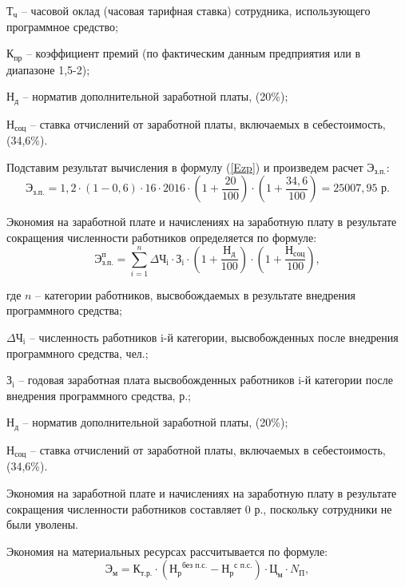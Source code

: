     $\text{Т}_{\text{ч}}$ -- часовой оклад (часовая тарифная ставка) сотрудника, использующего программное средство; 
    
    $\text{К}_{\text{пр}}$ -- коэффициент премий (по фактическим данным предприятия или в диапазоне 1,5-2); 
    
    $\text{Н}_{\text{д}}$ -- норматив дополнительной заработной платы, (20\%); 
    
    $\text{Н}_{\text{соц}}$ -- ставка отчислений от заработной платы, включаемых в себестоимость, (34,6\%).

Подставим результат вычисления в формулу (\ref{Ezp}) и произведем расчет $\text{Э}_{\text{з.п.}}$:
$$
    \text{Э}_{\text{з.п.}} = 1,2 \cdot (1-0,6)\cdot 16\cdot 2016 \cdot  (1+\frac{20}{100})\cdot (1+\frac{34,6}{100}) =  25007,95 \text{ р.}
$$



Экономия на заработной плате и начислениях на заработную плату в результате сокращения численности работников определяется по формуле:
\begin{equation}
    \text{Э}_{\text{з.п.}}^{\text{п}} = \sum\limits_{i=1}^{n} \Delta \text{Ч}_\text{i} \cdot \text{З}_\text{i}  \cdot (1+\frac{\text{Н}_{\text{д}}}{100})\cdot (1+\frac{\text{Н}_{\text{соц}}}{100}),
\end{equation}

где $n$ -- категории работников, высвобождаемых в результате внедрения программного средства; 

   $\Delta \text{Ч}_\text{i}$ -- численность работников i-й
категории, высвобожденных после внедрения программного средства,
чел.;

    $\text{З}_\text{i}$ -- годовая заработная плата высвобожденных работников i-й категории после внедрения программного средства, р.;
    
    $\text{Н}_{\text{д}}$ -- норматив дополнительной заработной платы, (20\%); 
    
    $\text{Н}_{\text{соц}}$ -- ставка отчислений от заработной платы, включаемых в себестоимость, (34,6\%).

Экономия на заработной плате и начислениях на заработную плату в результате сокращения численности работников составляет 0 р., поскольку сотрудники не были уволены.


Экономия на материальных ресурсах рассчитывается по формуле:
\begin{equation}
\label{Ezp}
    \text{Э}_{\text{м}} = \text{К}_{\text{т.р.}}\cdot ({\text{Н}_{\text{р}}}^{\text{без п.с.}}-{\text{Н}_{\text{р}}}^{\text{с п.с.}})\cdot \text{Ц}_{\text{м}}\cdot N_{\text{П}}, 
\end{equation}

